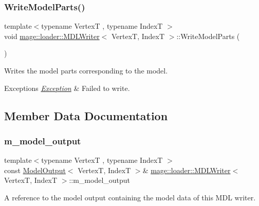\subsubsection{\texorpdfstring{Write\+Model\+Parts()}{WriteModelParts()}}
{\footnotesize\ttfamily template$<$typename VertexT , typename IndexT $>$ \\
void \hyperlink{classmage_1_1loader_1_1_m_d_l_writer}{mage\+::loader\+::\+M\+D\+L\+Writer}$<$ VertexT, IndexT $>$\+::Write\+Model\+Parts (\begin{DoxyParamCaption}{ }\end{DoxyParamCaption})\hspace{0.3cm}{\ttfamily [private]}}

Writes the model parts corresponding to the model.


\begin{DoxyExceptions}{Exceptions}
{\em \hyperlink{classmage_1_1_exception}{Exception}} & Failed to write. \\
\hline
\end{DoxyExceptions}


\subsection{Member Data Documentation}
\hypertarget{classmage_1_1loader_1_1_m_d_l_writer_a1849bbbc7a219f50bf167c12b1433995}{}\label{classmage_1_1loader_1_1_m_d_l_writer_a1849bbbc7a219f50bf167c12b1433995} 
\subsubsection{\texorpdfstring{m\+\_\+model\+\_\+output}{m\_model\_output}}
{\footnotesize\ttfamily template$<$typename VertexT , typename IndexT $>$ \\
const \hyperlink{structmage_1_1_model_output}{Model\+Output}$<$ VertexT, IndexT $>$\& \hyperlink{classmage_1_1loader_1_1_m_d_l_writer}{mage\+::loader\+::\+M\+D\+L\+Writer}$<$ VertexT, IndexT $>$\+::m\+\_\+model\+\_\+output\hspace{0.3cm}{\ttfamily [private]}}

A reference to the model output containing the model data of this M\+DL writer. 